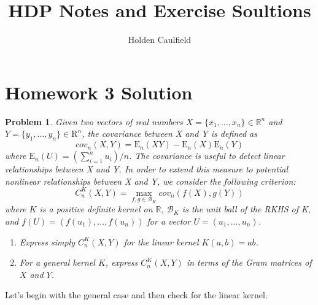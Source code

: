 \documentclass[12pt]{article}
\title{HDP Notes and Exercise Soultions}
\author{Holden Caulfield}
\newtheorem{ex}{Problem}
\begin{document}
	\centering	\section*{Homework 3 Solution}
	
	\begin{bx}
		
		\begin{ex}
	Given two vectors of real numbers $X=\{x_1,\dots,x_n\} \in \mathbb{R}^n$ and $Y=\{y_1,\dots,y_n\} \in \mathrm{R}^n$, the covariance between X and Y is defined as
	\[
	cov_n(X,Y)=\mathrm{E}_n(XY)-\mathrm{E}_n(X)\mathrm{E}_n(Y)
	\]
	where $\mathrm{E}_n(U)=(\sum_{i=1}^{n}u_i)/n$. The covariance is useful to detect linear relationships between X and Y. In order to extend this measure to potential
	nonlinear relationships between X and Y, we consider the following criterion:
	\[
	C_n^K(X,Y)=\max\limits_{f,g\in\mathcal{B}_K} cov_n(f(X),g(Y))
	\]
	where $K$ is a positive definite kernel on $\mathbb{R}$, $\mathcal{B}_K$ is the unit ball of the RKHS of K, and $f(U)=(f(u_1 ),\dots,f(u_n))$ for a vector $U=(u_1,\dots,u_n)$.
	\begin{enumerate}
		
		\item Express simply $C_n^K(X,Y)$ for the linear kernel $K(a,b)=ab$.
		
		\item For a general kernel $K$, express $C_n^K(X,Y)$ in terms of the Gram matrices of $X$ and $Y$.
		
	\end{enumerate}
		\end{ex}
		\tcblower
		
		Let's begin with the general case and then check for the linear kernel.
		

\end{bx}
\end{document}
